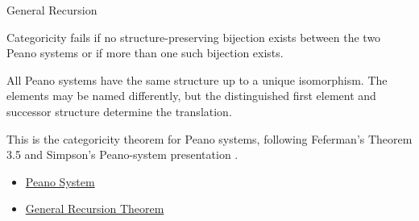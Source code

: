 \begin{topicbox}{General Recursion}
\begin{remark*}
Categoricity fails if no structure-preserving bijection exists between the two
Peano systems or if more than one such bijection exists.
\end{remark*}

\begin{remark*}[Interpretation]
All Peano systems have the same structure up to a unique isomorphism. The
elements may be named differently, but the distinguished first element and
successor structure determine the translation.
\end{remark*}

\begin{remark*}
This is the categoricity theorem for Peano systems, following Feferman's
Theorem 3.5 and Simpson's Peano-system presentation
\citep{FefermanNumberSystems1964,simpson2011peanosystems}.
\end{remark*}

\begin{dependencies}
\begin{itemize}
  \item \hyperref[def:peano-system]{Peano System}
  \item \hyperref[thm:general-recursion-theorem-for-peano-system]{General Recursion Theorem}
\end{itemize}
\end{dependencies}
\end{topicbox}

